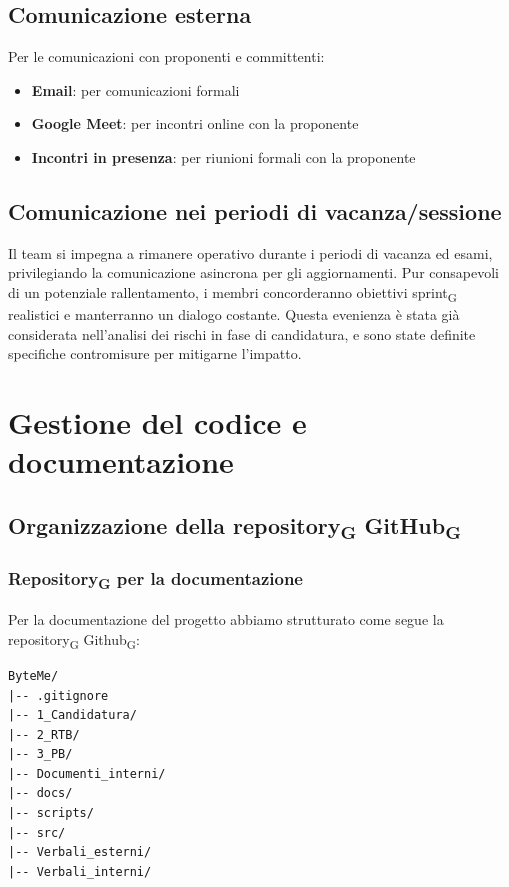\documentclass[11pt,a4paper]{article}
\newcommand{\gls}[1]{#1\textsubscript{G}}
\begin{document}
\subsection{Comunicazione esterna}
Per le comunicazioni con proponenti e committenti:
\begin{itemize}
    \item \textbf{Email}: per comunicazioni formali
    \item \textbf{Google Meet}: per incontri online con la proponente
    \item \textbf{Incontri in presenza}: per riunioni formali con la proponente
\end{itemize}

\subsection{Comunicazione nei periodi di vacanza/sessione}
Il team si impegna a rimanere operativo durante i periodi di vacanza ed esami, privilegiando la comunicazione asincrona per gli aggiornamenti. Pur consapevoli di un potenziale rallentamento, i membri concorderanno obiettivi \gls{sprint} realistici e manterranno un dialogo costante. Questa evenienza è stata già considerata nell'analisi dei rischi in fase di candidatura, e sono state definite specifiche contromisure per mitigarne l'impatto.

\newpage

\section{Gestione del codice e documentazione}

\subsection{Organizzazione della \gls{repository} \gls{GitHub}}

\subsubsection{\gls{Repository} per la documentazione}
Per la documentazione del progetto abbiamo strutturato come segue la \gls{repository} \gls{Github}:
\begin{verbatim}
ByteMe/
|-- .gitignore
|-- 1_Candidatura/
|-- 2_RTB/
|-- 3_PB/
|-- Documenti_interni/
|-- docs/
|-- scripts/
|-- src/
|-- Verbali_esterni/
|-- Verbali_interni/
\end{verbatim}
\end{document}
